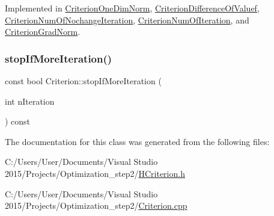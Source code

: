 Implemented in \hyperlink{class_criterion_one_dim_norm_a34169be5a51a1146f087858cc9716be7}{Criterion\+One\+Dim\+Norm}, \hyperlink{class_criterion_difference_of_valuef_afd9664b09456be745efd44d1577d26b1}{Criterion\+Difference\+Of\+Valuef}, \hyperlink{class_criterion_num_of_nochange_iteration_a4d46c7bfa8d1e31171d11c77a96e91ed}{Criterion\+Num\+Of\+Nochange\+Iteration}, \hyperlink{class_criterion_num_of_iteration_a9885d8e39da442c5ac1049e0546ffdfd}{Criterion\+Num\+Of\+Iteration}, and \hyperlink{class_criterion_grad_norm_aa482b08006d20c4aac09c0322feb3d6e}{Criterion\+Grad\+Norm}.

\mbox{\label{class_criterion_a579d93bfa87d36a3ae64a39fe3c2d172}} 
\subsubsection{\texorpdfstring{stop\+If\+More\+Iteration()}{stopIfMoreIteration()}}
{\footnotesize\ttfamily const bool Criterion\+::stop\+If\+More\+Iteration (\begin{DoxyParamCaption}\item[{int}]{n\+Iteration }\end{DoxyParamCaption}) const}



The documentation for this class was generated from the following files\+:\begin{DoxyCompactItemize}
\item 
C\+:/\+Users/\+User/\+Documents/\+Visual Studio 2015/\+Projects/\+Optimization\+\_\+step2/\hyperlink{_h_criterion_8h}{H\+Criterion.\+h}\item 
C\+:/\+Users/\+User/\+Documents/\+Visual Studio 2015/\+Projects/\+Optimization\+\_\+step2/\hyperlink{_criterion_8cpp}{Criterion.\+cpp}\end{DoxyCompactItemize}
